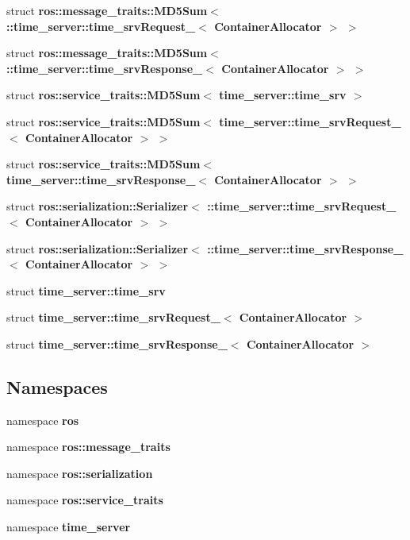 \begin{DoxyCompactItemize}
\item 
struct {\bf ros\-::message\-\_\-traits\-::\-M\-D5\-Sum$<$ \-::time\-\_\-server\-::time\-\_\-srv\-Request\-\_\-$<$ Container\-Allocator $>$ $>$}
\item 
struct {\bf ros\-::message\-\_\-traits\-::\-M\-D5\-Sum$<$ \-::time\-\_\-server\-::time\-\_\-srv\-Response\-\_\-$<$ Container\-Allocator $>$ $>$}
\item 
struct {\bf ros\-::service\-\_\-traits\-::\-M\-D5\-Sum$<$ time\-\_\-server\-::time\-\_\-srv $>$}
\item 
struct {\bf ros\-::service\-\_\-traits\-::\-M\-D5\-Sum$<$ time\-\_\-server\-::time\-\_\-srv\-Request\-\_\-$<$ Container\-Allocator $>$ $>$}
\item 
struct {\bf ros\-::service\-\_\-traits\-::\-M\-D5\-Sum$<$ time\-\_\-server\-::time\-\_\-srv\-Response\-\_\-$<$ Container\-Allocator $>$ $>$}
\item 
struct {\bf ros\-::serialization\-::\-Serializer$<$ \-::time\-\_\-server\-::time\-\_\-srv\-Request\-\_\-$<$ Container\-Allocator $>$ $>$}
\item 
struct {\bf ros\-::serialization\-::\-Serializer$<$ \-::time\-\_\-server\-::time\-\_\-srv\-Response\-\_\-$<$ Container\-Allocator $>$ $>$}
\item 
struct {\bf time\-\_\-server\-::time\-\_\-srv}
\item 
struct {\bf time\-\_\-server\-::time\-\_\-srv\-Request\-\_\-$<$ Container\-Allocator $>$}
\item 
struct {\bf time\-\_\-server\-::time\-\_\-srv\-Response\-\_\-$<$ Container\-Allocator $>$}
\end{DoxyCompactItemize}
\subsection*{\-Namespaces}
\begin{DoxyCompactItemize}
\item 
namespace {\bf ros}
\item 
namespace {\bf ros\-::message\-\_\-traits}
\item 
namespace {\bf ros\-::serialization}
\item 
namespace {\bf ros\-::service\-\_\-traits}
\item 
namespace {\bf time\-\_\-server}
\end{DoxyCompactItemize}
